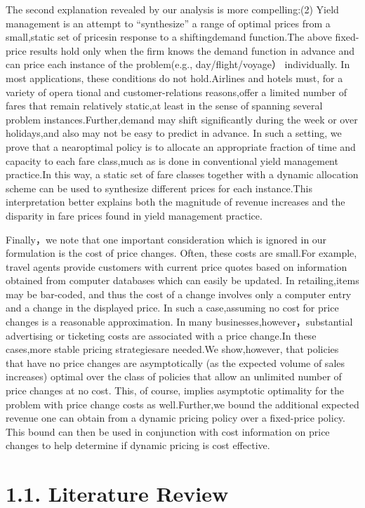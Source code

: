 The second explanation revealed by our analysis is more compelling:(2)
Yield management is an attempt to ``synthesize'' a range of optimal
prices from a small,static set of pricesin response to a shiftingdemand
function.The above fixed-price results hold only when the firm knows the
demand function in advance and can price each instance of the
problem(e.g., day/flight/voyage） individually. In most applications,
these conditions do not hold.Airlines and hotels must, for a variety of
opera tional and customer-relations reasons,offer a limited number of
fares that remain relatively static,at least in the sense of spanning
several problem instances.Further,demand may shift significantly during
the week or over holidays,and also may not be easy to predict in
advance. In such a setting, we prove that a nearoptimal policy is to
allocate an appropriate fraction of time and capacity to each fare
class,much as is done in conventional yield management practice.In this
way, a static set of fare classes together with a dynamic allocation
scheme can be used to synthesize different prices for each instance.This
interpretation better explains both the magnitude of revenue increases
and the disparity in fare prices found in yield management practice.

Finally，we note that one important consideration which is ignored in
our formulation is the cost of price changes. Often, these costs are
small.For example, travel agents provide customers with current price
quotes based on information obtained from computer databases which can
easily be updated. In retailing,items may be bar-coded, and thus the
cost of a change involves only a computer entry and a change in the
displayed price. In such a case,assuming no cost for price changes is a
reasonable approximation. In many businesses,however，substantial
advertising or ticketing costs are associated with a price change.In
these cases,more stable pricing strategiesare needed.We show,however,
that policies that have no price changes are asymptotically (as the
expected volume of sales increases) optimal over the class of policies
that allow an unlimited number of price changes at no cost. This, of
course, implies asymptotic optimality for the problem with price change
costs as well.Further,we bound the additional expected revenue one can
obtain from a dynamic pricing policy over a fixed-price policy. This
bound can then be used in conjunction with cost information on price
changes to help determine if dynamic pricing is cost effective.

\section{1.1. Literature Review}\label{literature-review}

